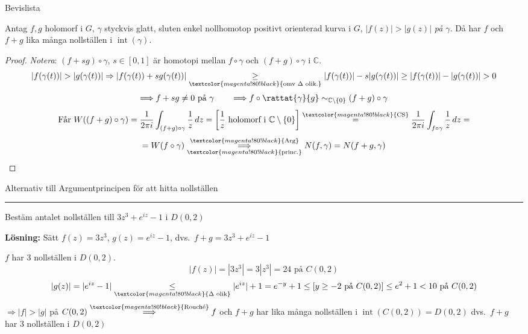 \begin{theorem}
\hfill \textcolor{magenta!80!black}{Bevislista}

Antag $f, g$ holomorf i $G$, $\gamma$ styckvis glatt, sluten enkel nollhomotop positivt orienterad kurva i $G$, $|f(z)| > |g(z)|$ \emph{på $\gamma$}. Då har $f$ och $f + g$ lika många nollställen i $\operatorname{int}(\gamma)$.
\end{theorem}
\begin{proof}
\emph{Notera}: $(f + sg) \circ \gamma$, $s \in [0, 1]$ är homotopi mellan $f \circ \gamma$ och $(f + g) \circ \gamma$ i $\mathbb{C}$.
\[ |f(\gamma(t))| > |g(\gamma(t))| \Rightarrow |f(\gamma(t)) + sg(\gamma(t))| \underset{\textcolor{magenta!80!black}{\text{omv } \Delta \text{ olik.}}}{\ge} |f(\gamma(t))| - s|g(\gamma(t))| \ge |f(\gamma(t))| - |g(\gamma(t))| > 0 \]
\[ \Longrightarrow f + sg \neq 0 \text{ på } \gamma \qquad \Longrightarrow f \circ \rattat{\gamma}{g} \sim_{\mathbb{C} \setminus \{0\}} (f + g) \circ \gamma \]
\[ \text{Får } W((f + g) \circ \gamma) = \frac{1}{2\pi i} \int_{(f + g) \circ \gamma} \frac{1}{z}\,dz = \left[ \frac{1}{z} \text{ holomorf i } \mathbb{C} \setminus \{0\} \right] \overset{\textcolor{magenta!80!black}{\text{CS}}}{=} \frac{1}{2\pi i} \int_{f \circ \gamma} \frac{1}{z}\,dz = \]
\[ = W(f \circ \gamma) \underset{\textcolor{magenta!80!black}{\text{princ.}}}{\overset{\textcolor{magenta!80!black}{\text{Arg}}}{\Longrightarrow}} N(f, \gamma) = N(f + g, \gamma) \]
\end{proof}

\textcolor{magenta!80!black}{Alternativ till Argumentprincipen för att hitta nollställen}

\noindent\rule{\linewidth}{0.4pt}

\begin{example}
Bestäm antalet nollställen till $3z^3 + e^{iz} - 1$ i $D(0, 2)$

\textbf{Lösning:} Sätt $f(z) = 3z^3$, $g(z) = e^{iz} - 1$, dvs.\ $f + g = 3z^3 + e^{iz} - 1$

$f$ har 3 nollställen i $D(0, 2)$.
\[ |f(z)| = |3z^3| = 3|z^3| = 24 \text{ på } C(0, 2) \]
\[ |g(z)| = |e^{iz} - 1| \underset{\textcolor{magenta!80!black}{\Delta \text{ olik}}}{\le} |e^{iz}| + 1 = e^{-y} + 1 \le [y \ge -2 \text{ på } C(0, 2)] \le e^2 + 1 < 10 \text{ på } C(0, 2) \]
$\Rightarrow |f| > |g|$ på $C(0, 2) \overset{\textcolor{magenta!80!black}{\text{Rouché}}}{\Longrightarrow} f$ och $f + g$ har lika många nollställen i $\operatorname{int}(C(0, 2)) = D(0, 2)$ dvs.\ $f + g$ har 3 nollställen i $D(0, 2)$
\end{example}

